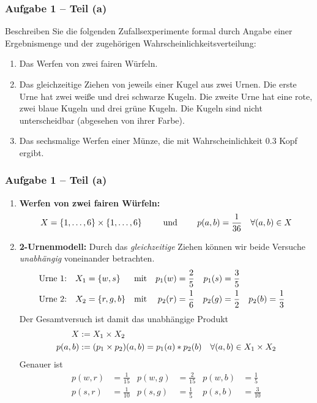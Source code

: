 \documentclass{beamer}
\begin{document}
\begin{frame} \frametitle{Aufgabe 1 -- Teil (a)}
	\justifying\small
	Beschreiben Sie die folgenden Zufallsexperimente formal durch Angabe einer Ergebnismenge und der zugehörigen Wahrscheinlichkeitsverteilung:
	\begin{enumerate}[1.]
		\item Das Werfen von zwei fairen Würfeln.
		\item Das gleichzeitige Ziehen von jeweils einer Kugel aus zwei Urnen. Die erste Urne hat
		zwei weiße und drei schwarze Kugeln. Die zweite Urne hat eine rote, zwei blaue Kugeln
		und drei grüne Kugeln. Die Kugeln sind nicht unterscheidbar (abgesehen von ihrer
		Farbe).
		\item Das sechsmalige Werfen einer Münze, die mit Wahrscheinlichkeit $0.3$ Kopf ergibt.
	\end{enumerate}
\end{frame}

\begin{frame} \frametitle{Aufgabe 1 -- Teil (a)}
	\footnotesize
	\begin{enumerate}[1.]
		\item \textbf{Werfen von zwei fairen Würfeln:} 
		\begin{equation*}
			X = \left\{ 1, \dots, 6 \right\} \times \left\{ 1, \dots, 6 \right\} \qquad \text{ und } \qquad p(a,b) = \frac{1}{36} \quad \forall (a,b) \in X
		\end{equation*}
		\item \textbf{2-Urnenmodell:} Durch das \textit{gleichzeitige} Ziehen können wir beide Versuche \textit{unabhängig} voneinander betrachten.
		\begin{align*}
			&\text{Urne 1:} & X_1 &= \left\{ w, s \right\} &&\text{mit} & p_1(w) &= \frac{2}{5} & p_1(s) &= \frac{3}{5} \\
			&\text{Urne 2:} & X_2 &= \left\{ r,g,b \right\} &&\text{mit} & p_2(r) &= \frac{1}{6} & p_2(g) &= \frac{1}{2}  & p_2(b) &= \frac{1}{3}
		\end{align*} 
		Der Gesamtversuch ist damit das unabhängige Produkt 
		\begin{align*}
			X &\mathrel{:=} X_1 \times X_2 \\
			p(a,b) &\mathrel{:=} (p_1 \times p_2)(a,b) = p_1(a) * p_2(b) \quad \forall (a,b) \in X_1 \times X_2
		\end{align*}
		Genauer ist
		\begin{align*}
			p(w,r) &= \frac{1}{15} & p(w,g) &= \frac{2}{15} & p(w, b) &= \frac{1}{5} \\
			p(s,r) &= \frac{1}{10} & p(s,g) &= \frac{1}{5} & p(s, b) &= \frac{3}{10}
		\end{align*}
	\end{enumerate}
\end{frame}
\end{document}
